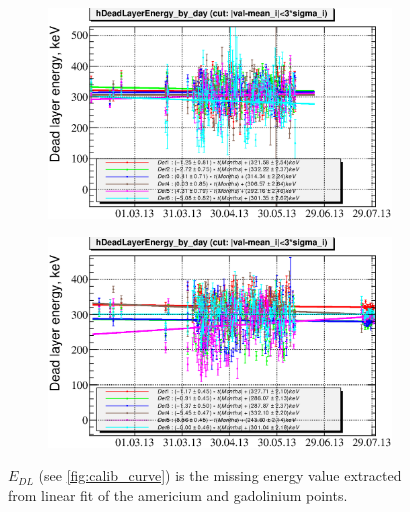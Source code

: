 \documentclass[a4paper]{article}
\begin{document}
\begin{figure}[p]
\begin{subfigure}[b]{0.5\textwidth}
\includegraphics[width=\textwidth]{gfx/run13_alpha_study/B2D/c_chDeadLayerEnergy_by_day_B2D.eps}
\end{subfigure}
\begin{subfigure}[b]{0.5\textwidth}
\includegraphics[width=\textwidth]{gfx/run13_alpha_study/Y2U/c_chDeadLayerEnergy_by_day_Y2U.eps}
\end{subfigure}
\caption{$E_{DL}$ (see \ref{fig:calib_curve}) is the missing energy value extracted from linear fit
of the americium and gadolinium points.}
\end{figure}
\end{document}
